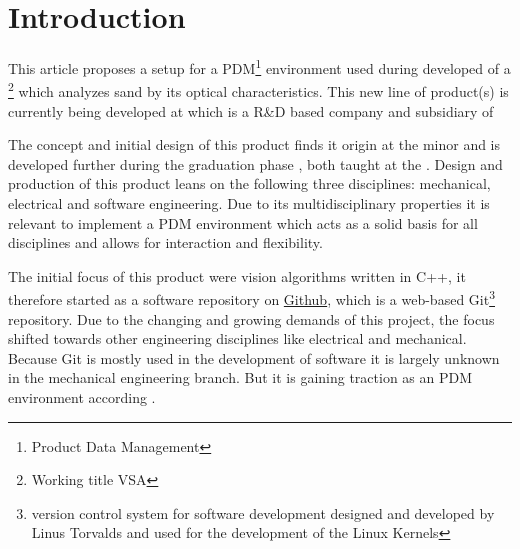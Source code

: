 \documentclass[fleqn,10pt]{SelfArx} %
\affiliation{\textsuperscript{1}\textit{Department of Engineering, HAN University of Applied Sciences, Arnhem, the Netherlands}} %
\affiliation{*\textbf{Corresponding author}: \href{mailto:spijker.jelle@gmail.com}{\color{color1}spijker.jelle@gmail.com}} %
\begin{document}
\flushbottom %

\maketitle %

\tableofcontents %

\thispagestyle{empty} %


\section*{Introduction} %
This article proposes a setup for a PDM\footnote{Product Data Management} environment used during developed of a \vsa\footnote{Working title VSA} which analyzes sand by its optical characteristics. This new line of product(s) is currently being developed at \href{http://www.mtiholland.com/}{\color{color1}\mti} which is a R\&D based company and subsidiary of \href{http://www.ihcmerwede.com/}{\color{color1}\ihc}

The concept and initial design of this product finds it origin at the minor \evd and is developed further during the graduation phase \wtb, both taught at the \href{http://www.han.nl/international/english/}{\color{color1}\instutionname}. Design and production of this product leans on the following three disciplines: mechanical, electrical and software engineering. Due to its multidisciplinary properties it is relevant to implement a PDM environment which acts as a solid basis for all disciplines and allows for interaction and flexibility. 

The initial focus of this product were vision algorithms written in C++, it therefore started as a software repository on \href{https://github.com/}{\color{color1}Github}, which is a web-based Git\footnote{version control system for software development designed and developed by Linus Torvalds and used for the development of the Linux Kernels} repository. Due to the changing and growing demands of this project, the focus shifted towards other engineering disciplines like electrical and mechanical. Because Git is mostly used in the development of software it is largely unknown in the mechanical engineering branch. But it is gaining traction as an PDM environment according \citeauthor{oleg_github_2013}\cite{oleg_github_2013}. 
\end{document}
